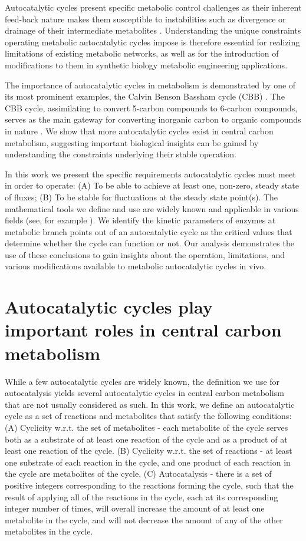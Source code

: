 \documentclass[a4page,notitlepage]{article}
\begin{document}
    Autocatalytic cycles present specific metabolic control challenges as their inherent feed-back nature makes them susceptible to instabilities such as divergence or drainage of their intermediate metabolites \cite{Fell1999,Reznik2010-te}.
    Understanding the unique constraints operating metabolic autocatalytic cycles impose is therefore essential for realizing limitations of existing metabolic networks, as well as for the introduction of modifications to them in synthetic biology metabolic engineering applications.

    The importance of autocatalytic cycles in metabolism is demonstrated by one of its most prominent examples, the Calvin Benson Bassham cycle (CBB) \cite{Benson1950-cl}.
    The CBB cycle, assimilating  to convert 5-carbon compounds to 6-carbon compounds, serves as the main gateway for converting inorganic carbon to organic compounds in nature \cite{Raven2012-le}.
    We show that more autocatalytic cycles exist in central carbon metabolism, suggesting important biological insights can be gained by understanding the constraints underlying their stable operation.

    In this work we present the specific requirements autocatalytic cycles must meet in order to operate: (A) To be able to achieve at least one, non-zero, steady state of fluxes; 
    (B) To be stable for fluctuations at the steady state point(s).
    The mathematical tools we define and use are widely known and applicable in various fields (see, for example \cite{Strogatz2014-hp}).
    We identify the kinetic parameters of enzymes at metabolic branch points out of an autocatalytic cycle as the critical values that determine whether the cycle can function or not.
    Our analysis demonstrates the use of these conclusions to gain insights about the operation, limitations, and various modifications available to metabolic autocatalytic cycles in vivo.

\section{Autocatalytic cycles play important roles in central carbon metabolism}

While a few autocatalytic cycles are widely known, the definition we use for autocatalysis yields several autocatalytic cycles in central carbon metabolism that are not usually considered as such.
In this work, we define an autocatalytic cycle as a set of reactions and metabolites that satisfy the following conditions:
(A) Cyclicity w.r.t. the set of metabolites - each metabolite of the cycle serves both as a substrate of at least one reaction of the cycle and as a product of at least one reaction of the cycle.
(B) Cyclicity w.r.t. the set of reactions - at least one substrate of each reaction in the cycle, and one product of each reaction in the cycle are metabolites of the cycle.
(C) Autocatalysis - there is a set of positive integers corresponding to the reactions forming the cycle, such that the result of applying all of the reactions in the cycle, each at its corresponding integer number of times, will overall increase the amount of at least one metabolite in the cycle, and will not decrease the amount of any of the other metabolites in the cycle.
\end{document}
